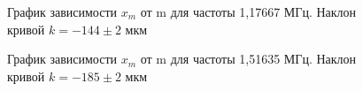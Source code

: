 \documentclass[a4paper,12pt]{article} %
\begin{document}
\begin{figure}[H]
  \caption{\centering График зависимости $x_{m}$ от m для частоты 1,17667 МГц. Наклон кривой $k = -144 \pm 2$ мкм
}
	\label{fig:image1}
\end{figure}
\begin{figure}[H]
  \caption{\centering График зависимости $x_{m}$ от m для частоты 1,51635 МГц. Наклон кривой $k = -185 \pm 2$ мкм
}
	\label{fig:image1}
\end{figure}
\end{document}
